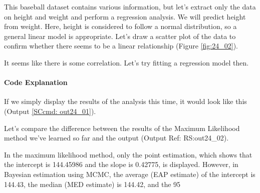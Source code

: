 \documentclass{ltjsbook}
\begin{document}
This baseball dataset contains various information, but let's extract only the data on height and weight and perform a regression analysis. We will predict height from weight. Here, height is considered to follow a normal distribution, so a general linear model is appropriate. Let's draw a scatter plot of the data to confirm whether there seems to be a linear relationship (Figure \ref{fig:24_02}).



It seems like there is some correlation. Let's try fitting a regression model then.

\paragraph{Code Explanation}


If we simply display the results of the analysis this time, it would look like this (Output \ref{SCcmd: out24_01}).

Let's compare the difference between the results of the Maximum Likelihood method we've learned so far and the output (Output Ref: RS:out24_02).

In the maximum likelihood method, only the point estimation, which shows that the intercept is 144.45986 and the slope is 0.42775, is displayed. However, in Bayesian estimation using MCMC, the average (EAP estimate) of the intercept is 144.43, the median (MED estimate) is 144.42, and the 95%
\end{document}

